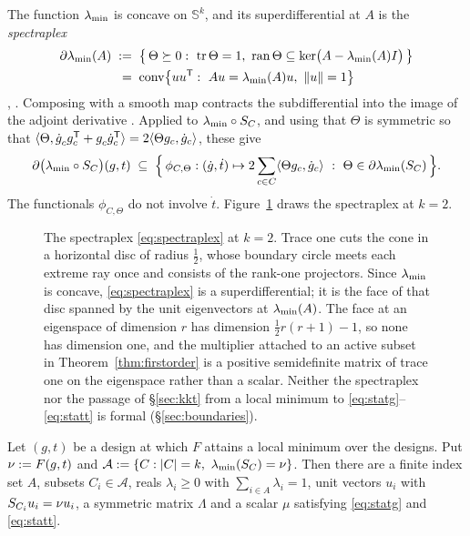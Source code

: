The function $\lambda_{\min}$ is concave on $\mathbb{S}^k$, and its
superdifferential at $A$ is the \emph{spectraplex}
\begin{equation}\label{eq:spectraplex}
\begin{aligned}
  \partial\lambda_{\min}(A)\;&:=\;\bigl\{\,\Theta\succeq0:\ \operatorname{tr}\Theta=1,\
    \operatorname{ran}\Theta\subseteq\ker\bigl(A-\lambda_{\min}(A)I\bigr)\,\bigr\}\\
  &\;=\;\operatorname{conv}\bigl\{uu^{\mathsf{T}}:\ Au=\lambda_{\min}(A)u,\
    \lVert u\rVert=1\bigr\}
\end{aligned}
\end{equation}
\cite[\S2]{Overton1988},
\cite[Vol.~I, Ch.~VI]{HiriartUrrutyLemarechal1993}.  Composing with a
smooth map contracts the subdifferential into the image of the adjoint
derivative \cite[Thm.~2.3.10]{Clarke1990}.  Applied to
$\lambda_{\min}\circ S_{C}$, and using that $\Theta$ is symmetric so that
$\langle\Theta,\dot g_c^{\vphantom{\mathsf{T}}}g_c\tp
+g_c^{\vphantom{\mathsf{T}}}\dot g_c\tp\rangle
=2\langle\Theta g_c,\dot g_c\rangle$, these give
\begin{equation}\label{eq:pieceSub}
  \partial\bigl(\lambda_{\min}\circ S_{C}\bigr)(g,t)
  \;\subseteq\;
  \Bigl\{\,\phi_{C,\Theta}:(\dot g,\dot t)\mapsto
    2\sum_{c\in C}\langle\Theta g_c,\dot g_c\rangle
    \ :\ \Theta\in\partial\lambda_{\min}(S_{C})\,\Bigr\}.
\end{equation}
The functionals $\phi_{C,\Theta}$ do not involve $\dot t$.
Figure~\ref{fig:spectraplex} draws the spectraplex at $k=2$.

\begin{figure}[ht]
  \centering
  
  \caption{The spectraplex \eqref{eq:spectraplex} at $k=2$.  Trace one cuts
  the cone in a horizontal disc of radius $\tfrac12$, whose boundary circle
  meets each extreme ray once and consists of the rank-one projectors.  Since
  $\lambda_{\min}$ is concave, \eqref{eq:spectraplex} is a superdifferential; it is the
  face of that disc spanned by the unit eigenvectors at $\lambda_{\min}(A)$.  The face
  at an eigenspace of dimension $r$ has dimension $\tfrac12r(r+1)-1$, so none
  has dimension one, and the multiplier attached to an active subset in
  Theorem~\ref{thm:firstorder} is a positive semidefinite matrix of trace one
  on the eigenspace rather than a scalar.  Neither the spectraplex nor the
  passage of \S\ref{sec:kkt} from a local minimum to
  \eqref{eq:statg}--\eqref{eq:statt} is formal (\S\ref{sec:boundaries}).}
  \label{fig:spectraplex}
\end{figure}

\begin{theorem}\label{thm:firstorder}
Let $(g,t)$ be a design at which $F$ attains a local minimum over the
designs.  Put $\nu:=F(g,t)$ and
$\mathcal{A}:=\{C:\lvert C\rvert=k,\ \lmin(\SC)=\cv\}$.  Then there are a
finite index set $A$, subsets $C_i\in\mathcal{A}$, reals $\lambda_i\ge0$
with $\sum_{i\in A}\lambda_i=1$, unit vectors $u_i$ with
$S_{C_i}u_i=\nu u_i$, a symmetric matrix $\Lambda$ and a scalar $\mu$
satisfying \eqref{eq:statg} and \eqref{eq:statt}.
\end{theorem}

